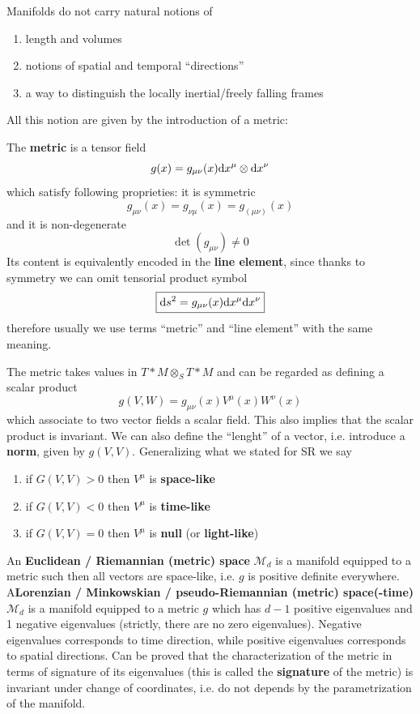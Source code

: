 \documentclass[../main/main.tex]{subfiles}
\begin{document}
Manifolds do not carry natural notions of 
\begin{enumerate}[ label=\textbullet]
\item length and volumes
\item notions of spatial and temporal ``directions''
\item a way to distinguish the locally inertial/freely falling frames
\end{enumerate}
All this notion are given by the introduction of a metric:

\begin{definition}[Metric]{}

The \textbf{metric} is a tensor field
\[g(x)=g_{\mu\nu}(x)\textup{d} x^\mu\otimes\textup{d} x^\nu\]
which satisfy following proprieties: it is symmetric
\[g_{\mu\nu}(x)=g_{\nu\mu}(x)=g_{(\mu\nu)}(x)\]
and it is non-degenerate
\[\det(g_{\mu\nu})\neq0\]
Its content is equivalently encoded in the \textbf{line element}, since thanks to symmetry we can omit tensorial product symbol
\[\boxed{\textup{d} s^2=g_{\mu\nu}(x)\textup{d} x^\mu\textup{d} x^\nu}\]
therefore usually we use terms ``metric'' and ``line element'' with the same meaning. 

The metric takes values in $T*M\otimes_ST*M$ and can be regarded as defining a scalar product
\[g(V,W)=g_{\mu\nu}(x)V^\mu(x)W^\nu(x)\]
which associate to two vector fields a scalar field. This also implies that the scalar product is invariant. We can also define the ``lenght'' of a vector, i.e. introduce a \textbf{norm}, given by $g(V,V)$. Generalizing what we stated for SR we say
\begin{enumerate}
\item if $G(V,V)>0$ then $V^\mu$ is \textbf{space-like}
\item if $G(V,V)<0$ then $V^\mu$ is \textbf{time-like}
\item if $G(V,V)=0$ then $V^\mu$ is \textbf{null} (or \textbf{light-like})
\end{enumerate}
An \textbf{Euclidean / Riemannian (metric) space} $\mathcal M_d$ is a manifold equipped to a metric such then all vectors are space-like, i.e. $g$ is positive definite everywhere. A\textbf{Lorenzian / Minkowskian / pseudo-Riemannian (metric) space(-time)} $\mathcal M_d$  is a manifold equipped to a metric $g$ which has $d-1$ positive eigenvalues and 1 negative eigenvalues (strictly, there are no zero eigenvalues). Negative eigenvalues corresponds to time direction, while positive eigenvalues corresponds to spatial directions. Can be proved that the characterization of the metric in terms of signature of its eigenvalues (this is called the \textbf{signature} of the metric) is invariant under change of coordinates, i.e. do not depends by the parametrization of the manifold. 

\end{definition}
\end{document}

